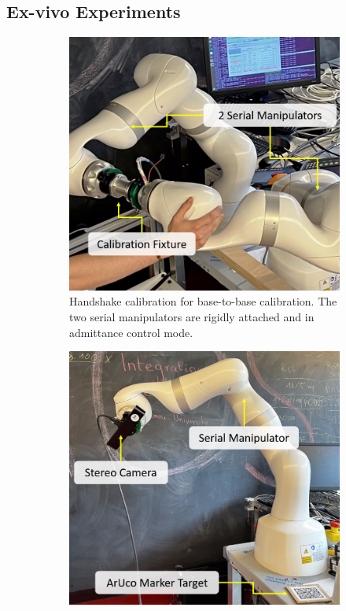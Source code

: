 \subsection{Ex-vivo Experiments}
\label{c1:sec:ex_vivo_experiments}
\begin{figure}[tb]
     \centering
     \begin{subfigure}[b]{0.3\textwidth}
         \centering
         \includegraphics[width=\textwidth]{fig/handshake.png}
         \caption{Handshake calibration for base-to-base calibration. The two serial manipulators are rigidly attached and in admittance control mode.}
         \label{c1:fig:handshake}
     \end{subfigure}
     \hfill
     \begin{subfigure}[b]{0.3\textwidth}
         \centering
         \includegraphics[width=\textwidth]{fig/eye_in_hand.png}

\end{subfigure}
\end{figure}
